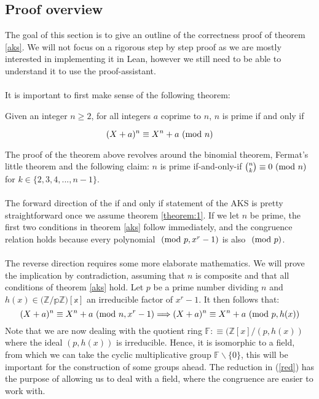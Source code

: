 \documentclass[../main.tex]{subfiles}
\begin{document}
\subsection{Proof overview}
The goal of this section is to give an outline of the correctness proof of theorem \ref{aks}. We will not focus on a rigorous step by step proof as we are mostly interested in implementing it in Lean, however we still need to be able to understand it to use the proof-assistant.  
\\\\
It is important to first make sense of the following theorem:
\begin{theorem} \label{theorem:1}
Given an integer $n \geq 2$, for all integers $a$ coprime to $n$, $n$ is prime if and only if

\begin{equation*}
    (X + a)^{n} \equiv X^{n} + a \ (\mathrm{mod}\ n)
\end{equation*}

\end{theorem}
The proof of the theorem above revolves around the binomial theorem, Fermat's little theorem and the following claim: $n$ is prime if-and-only-if $\binom{n}{k} \equiv 0 \ (\mathrm{mod}\ n)$ for $k \in \{ 2,3,4,...,n-1 \}$.\\\\
The forward direction of the if and only if statement of the AKS is pretty straightforward once we assume theorem \ref{theorem:1}. If we let $n$ be prime, the first two conditions in theorem \ref{aks} follow immediately, and the congruence relation holds because every polynomial $\ (\mathrm{mod}\ p,x^r-1)$ is also $\ (\mathrm{mod}\ p)$.
\\\\
The reverse direction requires some more elaborate mathematics. We will prove the implication by contradiction, assuming that $n$ is composite and that all conditions of theorem \ref{aks} hold. Let $p$ be a prime number dividing $n$ and $h(x)\in (\mathbb{Z/p\mathbb{Z})[x]}$ an irreducible factor of $x^r-1$. It then follows that:
\begin{equation}
\label{red}
    (X + a)^{n} \equiv X^{n} + a \ (\mathrm{mod}\ n,x^r-1) \Longrightarrow (X + a)^{n} \equiv X^{n} + a \ (\mathrm{mod}\ p,h(x))
\end{equation}
Note that we are now dealing with the quotient ring $\mathbb{F}:\equiv(\mathbb{Z}[x]/(p,h(x))$ where the ideal $(p,h(x))$ is irreducible. Hence, it is isomorphic to a field, from which we can take the cyclic multiplicative group $\mathbb{F}\backslash \{0\}$, this will be important for the construction of some groups ahead. The reduction in (\ref{red}) has the purpose of allowing us to deal with a field, where the congruence are easier to work with.
\end{document}
